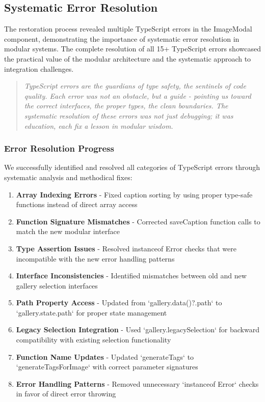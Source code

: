 \documentclass[11pt]{article}
\begin{document}
\subsection{Systematic Error Resolution}

The restoration process revealed multiple TypeScript errors in the ImageModal component, demonstrating the importance of systematic error resolution in modular systems. The complete resolution of all 15+ TypeScript errors showcased the practical value of the modular architecture and the systematic approach to integration challenges.

\begin{quote}
\emph{TypeScript errors are the guardians of type safety, the sentinels of code quality. Each error was not an obstacle, but a guide - pointing us toward the correct interfaces, the proper types, the clean boundaries. The systematic resolution of these errors was not just debugging; it was education, each fix a lesson in modular wisdom.}
\end{quote}

\subsubsection{Error Resolution Progress}

We successfully identified and resolved all categories of TypeScript errors through systematic analysis and methodical fixes:

\begin{enumerate}
\item \textbf{Array Indexing Errors} - Fixed caption sorting by using proper type-safe functions instead of direct array access
\item \textbf{Function Signature Mismatches} - Corrected saveCaption function calls to match the new modular interface
\item \textbf{Type Assertion Issues} - Resolved instanceof Error checks that were incompatible with the new error handling patterns
\item \textbf{Interface Inconsistencies} - Identified mismatches between old and new gallery selection interfaces
\item \textbf{Path Property Access} - Updated from `gallery.data()?.path` to `gallery.state.path` for proper state management
\item \textbf{Legacy Selection Integration} - Used `gallery.legacySelection` for backward compatibility with existing selection functionality
\item \textbf{Function Name Updates} - Updated `generateTags` to `generateTagsForImage` with correct parameter signatures
\item \textbf{Error Handling Patterns} - Removed unnecessary `instanceof Error` checks in favor of direct error throwing
\end{enumerate}
\end{document}
